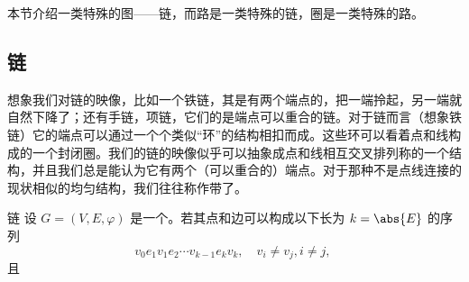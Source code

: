
本节介绍一类特殊的图——链，而路是一类特殊的链，圈是一类特殊的路。

\subsection{链}
想象我们对链的映像，比如一个铁链，其是有两个端点的，把一端拎起，另一端就自然下降了；还有手链，项链，它们的是端点可以重合的链。对于链而言（想象铁链）它的端点可以通过一个个类似“环”的结构相扣而成。这些环可以看着点和线构成的一个封闭圈。我们的链的映像似乎可以抽象成点和线相互交叉排列称的一个结构，并且我们总是能认为它有两个（可以重合的）端点。对于那种不是点线连接的现状相似的均匀结构，我们往往称作带了。

\begin{definition}{链}
设 $G=(V,E,\varphi)$ 是一个。若其点和边可以构成以下长为 $k=\abs{E}$ 的序列
\begin{equation}
v_0 e_1v_1e_2\cdots v_{k-1} e_kv_k,\quad v_i\neq v_j,i\neq j,~
\end{equation}
且
\end{definition}














